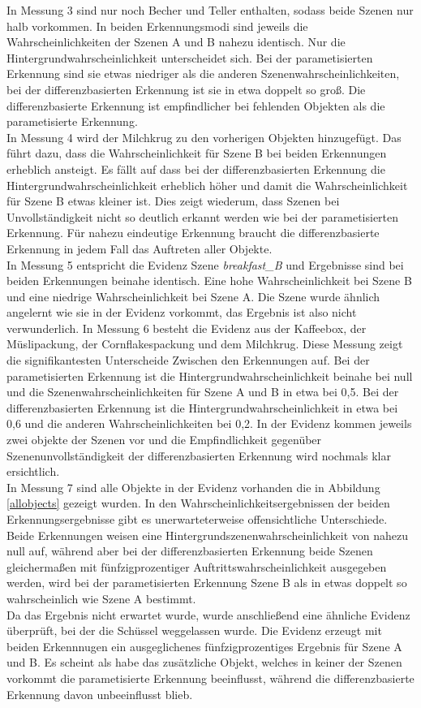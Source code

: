 In Messung 3 sind nur noch Becher und Teller enthalten, sodass beide Szenen nur halb vorkommen. In beiden Erkennungsmodi sind jeweils die Wahrscheinlichkeiten der Szenen A und B nahezu identisch. Nur die Hintergrundwahrscheinlichkeit unterscheidet sich. Bei der parametisierten Erkennung sind sie etwas niedriger als die anderen Szenenwahrscheinlichkeiten, bei der differenzbasierten Erkennung ist sie in etwa doppelt so groß. Die differenzbasierte Erkennung ist empfindlicher bei fehlenden Objekten als die parametisierte Erkennung.\smallskip\\
In Messung 4 wird der Milchkrug zu den vorherigen Objekten hinzugefügt. Das führt dazu, dass die Wahrscheinlichkeit für Szene B bei beiden Erkennungen erheblich ansteigt. Es fällt auf dass bei der differenzbasierten Erkennung die Hintergrundwahrscheinlichkeit erheblich höher und damit die Wahrscheinlichkeit für Szene B etwas kleiner ist. Dies zeigt wiederum, dass Szenen bei Unvollständigkeit nicht so deutlich erkannt werden wie bei der parametisierten Erkennung. Für nahezu eindeutige Erkennung braucht die differenzbasierte Erkennung in jedem Fall das Auftreten aller Objekte.\smallskip\\
In Messung 5 entspricht die Evidenz Szene \textit{breakfast\_B} und Ergebnisse sind bei beiden Erkennungen beinahe identisch. Eine hohe Wahrscheinlichkeit bei Szene B und eine niedrige Wahrscheinlichkeit bei Szene A. Die Szene wurde ähnlich angelernt wie sie in der Evidenz vorkommt, das Ergebnis ist also nicht verwunderlich.
In Messung 6 besteht die Evidenz aus der Kaffeebox, der Müslipackung, der Cornflakespackung und dem Milchkrug. Diese Messung zeigt die signifikantesten Unterscheide Zwischen den Erkennungen auf. Bei der parametisierten Erkennung ist die Hintergrundwahrscheinlichkeit beinahe bei null und die Szenenwahrscheinlichkeiten für Szene A und B in etwa bei 0,5. Bei der differenzbasierten Erkennung ist die Hintergrundwahrscheinlichkeit in etwa bei 0,6 und die anderen Wahrscheinlichkeiten bei 0,2. In der Evidenz kommen jeweils zwei objekte der Szenen vor und die Empfindlichkeit gegenüber Szenenunvollständigkeit der differenzbasierten Erkennung wird nochmals klar ersichtlich.\smallskip\\
In Messung 7 sind alle Objekte in der Evidenz vorhanden die in Abbildung \ref{allobjects} gezeigt wurden. In den Wahrscheinlichkeitsergebnissen der beiden Erkennungsergebnisse gibt es unerwarteterweise offensichtliche Unterschiede. Beide Erkennungen weisen eine Hintergrundszenenwahrscheinlichkeit von nahezu null auf, während aber bei der differenzbasierten Erkennung beide Szenen gleichermaßen mit fünfzigprozentiger Auftrittswahrscheinlichkeit ausgegeben werden, wird bei der parametisierten Erkennung Szene B als in etwas doppelt so wahrscheinlich wie Szene A bestimmt. \smallskip\\
Da das Ergebnis nicht erwartet wurde, wurde anschließend eine ähnliche Evidenz überprüft, bei der die Schüssel weggelassen wurde. Die Evidenz erzeugt mit beiden Erkennnugen ein ausgeglichenes fünfzigprozentiges Ergebnis für Szene A und B. Es scheint als habe das zusätzliche Objekt, welches in keiner der Szenen vorkommt die parametisierte Erkennung beeinflusst, während die differenzbasierte Erkennung davon unbeeinflusst blieb.\smallskip\\

